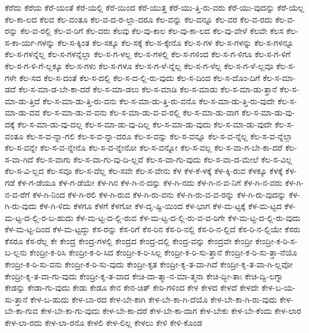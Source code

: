 {ಕೆರೆದು
ಕೆರೆಯ
ಕೆರೆ-ಯಂತೆ
ಕೆರೆ-ಯಲ್ಲಿ
ಕೆರೆ-ಯಿಂದ
ಕೆರೆ-ಯುತ್ತ
ಕೆರೆ-ಯು-ತ್ತಿ-ರು-ವರು
ಕೆರೆ-ಯು-ವುದನ್ನು
ಕೆರೆ-ಯೆಲ್ಲ
ಕೆಲ-ಕಾ-ಲದ
ಕೆಲವ
ಕೆಲ-ವಂತೂ
ಕೆಲ-ವ-ದ-ರ-ಲ್ಲಾ-ದರೂ
ಕೆಲ-ವನ್ನು
ಕೆಲ-ವನ್ನೂ
ಕೆಲ-ವರ
ಕೆಲ-ವ-ರದು
ಕೆಲ-ವ-ರನ್ನು
ಕೆಲ-ವ-ರಲ್ಲಿ
ಕೆಲ-ವ-ರಿಗೆ
ಕೆಲ-ವರು
ಕೆಲವು
ಕೆಲ-ವು-ಕಾಲ
ಕೆಲ-ವು-ಕಾ-ಲದ
ಕೆಲ-ವು-ವೇಳೆ
ಕೆಲವೇ
ಕೆಲಸ
ಕೆಲ-ಸ-ಕಾ-ರ್ಯ-ಗಳನ್ನು
ಕೆಲ-ಸ-ಕ್ಕಿಂತ
ಕೆಲ-ಸಕ್ಕೂ
ಕೆಲ-ಸಕ್ಕೆ
ಕೆಲ-ಸ-ಕ್ಕೇನೊ
ಕೆಲ-ಸ-ಗಳ
ಕೆಲ-ಸ-ಗಳನ್ನು
ಕೆಲ-ಸ-ಗಳನ್ನೂ
ಕೆಲ-ಸ-ಗಳನ್ನೆಲ್ಲ
ಕೆಲ-ಸ-ಗಳನ್ನೆಲ್ಲಾ
ಕೆಲ-ಸ-ಗ-ಳಲ್ಲ
ಕೆಲ-ಸ-ಗಳಲ್ಲಿ
ಕೆಲ-ಸ-ಗಳಿಂದ
ಕೆಲ-ಸ-ಗ-ಳಿಗೂ
ಕೆಲ-ಸ-ಗ-ಳಿಗೆ
ಕೆಲ-ಸ-ಗ-ಳಿ-ಗೆ-ಲ್ಲಕ್ಕೂ
ಕೆಲ-ಸ-ಗಳು
ಕೆಲ-ಸ-ಗಳೂ
ಕೆಲ-ಸ-ಗ-ಳೆ-ನ್ನೆಲ್ಲ
ಕೆಲ-ಸ-ಗ-ಳೆಲ್ಲ
ಕೆಲ-ಸ-ಗ-ಳೆ-ಲ್ಲವೂ
ಕೆಲ-ಸ-ಗಳೇ
ಕೆಲ-ಸದ
ಕೆಲ-ಸ-ದಂತೆ
ಕೆಲ-ಸ-ದಲ್ಲಿ
ಕೆಲ-ಸ-ದ-ಲ್ಲಿ-ರು-ವುದು
ಕೆಲ-ಸ-ದಿಂದ
ಕೆಲ-ಸ-ದೊಂ-ದಿಗೆ
ಕೆಲ-ಸ-ಮಾ-ಡದೆ
ಕೆಲ-ಸ-ಮಾ-ಡ-ಬೇ-ಕಾ-ದರೆ
ಕೆಲ-ಸ-ಮಾ-ಡಲು
ಕೆಲ-ಸ-ಮಾಡಿ
ಕೆಲ-ಸ-ಮಾಡು
ಕೆಲ-ಸ-ಮಾ-ಡು-ತ್ತಾನೆ
ಕೆಲ-ಸ-ಮಾ-ಡು-ತ್ತಿದೆ
ಕೆಲ-ಸ-ಮಾ-ಡು-ತ್ತಿ-ರು-ವನು
ಕೆಲ-ಸ-ಮಾ-ಡು-ತ್ತಿ-ರು-ವನೊ
ಕೆಲ-ಸ-ಮಾ-ಡು-ತ್ತಿ-ರು-ವುದೇ
ಕೆಲ-ಸ-ಮಾ-ಡು-ವವ
ಕೆಲ-ಸ-ಮಾ-ಡು-ವ-ವನು
ಕೆಲ-ಸ-ಮಾ-ಡು-ವ-ವ-ರಲ್ಲಿ
ಕೆಲ-ಸ-ಮಾ-ಡು-ವಾಗ
ಕೆಲ-ಸ-ಮಾ-ಡು-ವು-ದಕ್ಕೆ
ಕೆಲ-ಸ-ಮಾ-ಡು-ವು-ದಲ್ಲ
ಕೆಲ-ಸ-ಮಾ-ಡು-ವು-ದಿಲ್ಲ
ಕೆಲ-ಸ-ಮಾ-ಡು-ವುದು
ಕೆಲ-ಸ-ಮಾ-ಡು-ವುದೇ
ಕೆಲ-ಸ-ವಂತೂ
ಕೆಲ-ಸ-ವ-ನ್ನಾ-ಗಲಿ
ಕೆಲ-ಸ-ವ-ನ್ನಾ-ದರೂ
ಕೆಲ-ಸ-ವನ್ನು
ಕೆಲ-ಸ-ವನ್ನೂ
ಕೆಲ-ಸ-ವ-ನ್ನೆಲ್ಲ
ಕೆಲ-ಸ-ವ-ನ್ನೆಲ್ಲಾ
ಕೆಲ-ಸ-ವನ್ನೇ
ಕೆಲ-ಸ-ವ-ನ್ನೇನೊ
ಕೆಲ-ಸ-ವ-ನ್ನೇನೋ
ಕೆಲ-ಸ-ವನ್ನೋ
ಕೆಲ-ಸ-ವಲ್ಲ
ಕೆಲ-ಸ-ವಾ-ಗ-ಬೇ-ಕಾ-ದರೆ
ಕೆಲ-ಸ-ವಾ-ಗಿದೆ
ಕೆಲ-ಸ-ವಾಗು
ಕೆಲ-ಸ-ವಾ-ಗು-ವು-ದಿ-ಲ್ಲವೆ
ಕೆಲ-ಸ-ವಾ-ಗು-ವುದು
ಕೆಲ-ಸ-ವಾ-ದ-ಮೇಲೆ
ಕೆಲ-ಸ-ವಿಲ್ಲ
ಕೆಲ-ಸ-ವಿ-ಲ್ಲದ
ಕೆಲ-ಸವೂ
ಕೆಲ-ಸ-ವೆಲ್ಲ
ಕೆಲ-ಸವೇ
ಕೆಲ-ಸ-ವೇನು
ಕೆಳ
ಕೆಳ-ಕೆ-ಳಕ್ಕೆ
ಕೆಳ-ಕ್ಕಿ-ರುವ
ಕೆಳಕ್ಕೂ
ಕೆಳಕ್ಕೆ
ಕೆಳ-ಗಡೆ
ಕೆಳ-ಗ-ಡೆಯೂ
ಕೆಳ-ಗ-ಡೆಯೇ
ಕೆಳ-ಗಿನ
ಕೆಳ-ಗಿ-ನ-ದನ್ನು
ಕೆಳ-ಗಿ-ನದು
ಕೆಳ-ಗಿ-ನ-ವ-ನಿಗೆ
ಕೆಳ-ಗಿ-ನ-ವರು
ಕೆಳ-ಗಿ-ನ-ವ-ರೆಗೆ
ಕೆಳ-ಗಿ-ನಿಂದ
ಕೆಳ-ಗಿ-ರಲಿ
ಕೆಳ-ಗಿ-ರುವ
ಕೆಳ-ಗಿ-ರು-ವನು
ಕೆಳ-ಗಿ-ರು-ವ-ವ-ರನ್ನು
ಕೆಳ-ಗಿ-ರು-ವುದನ್ನು
ಕೆಳ-ಗಿ-ರು-ವುದು
ಕೆಳ-ಗಿ-ಳಿದು
ಕೆಳಗೂ
ಕೆಳಗೆ
ಕೆಳಗೋ
ಕೆಳ-ದೃ-ಷ್ಟಿ-ಯಿಂದ
ಕೆಳ-ಭಾಗ
ಕೆಳ-ಮ-ಟ್ಟಕ್ಕೆ
ಕೆಳ-ಮ-ಟ್ಟದ
ಕೆಳ-ಮ-ಟ್ಟ-ದ-ಲ್ಲಿ-ರ-ಬ-ಹುದು
ಕೆಳ-ಮ-ಟ್ಟ-ದ-ಲ್ಲಿ-ರುವ
ಕೆಳ-ಮ-ಟ್ಟ-ದ-ಲ್ಲಿ-ರು-ವ-ವ-ರಿಗೇ
ಕೆಳ-ಮ-ಟ್ಟ-ದ-ಲ್ಲಿ-ರು-ವುದು
ಕೆಳ-ಮ-ಟ್ಟ-ದಿಂದ
ಕೆಳ-ಮ-ಟ್ಟದ್ದು
ಕೆಸ-ರನ್ನು
ಕೆಸ-ರಿಗೆ
ಕೆಸ-ರಿನ
ಕೆಸ-ರಿ-ನಲ್ಲಿ
ಕೆಸ-ರಿ-ನ-ಲ್ಲಿದೆ
ಕೆಸ-ರಿ-ನ-ಲ್ಲಿಯೇ
ಕೆಸರು
ಕೆಸರೂ
ಕೆಸ-ರೆಲ್ಲ
ಕೇ
ಕೇಂದ್ರ
ಕೇಂದ್ರ-ಗಳಲ್ಲಿ
ಕೇಂದ್ರದ
ಕೇಂದ್ರ-ದಲ್ಲಿ
ಕೇಂದ್ರ-ವನ್ನು
ಕೇಂದ್ರವೇ
ಕೇಂದ್ರೀ
ಕೇಂದ್ರೀ-ಕ-ರಿ-ಸ-ಬ-ಲ್ಲನು
ಕೇಂದ್ರೀ-ಕ-ರಿಸಿ
ಕೇಂದ್ರೀ-ಕ-ರಿ-ಸಿದ
ಕೇಂದ್ರೀ-ಕ-ರಿ-ಸಿಲ್ಲ
ಕೇಂದ್ರೀ-ಕ-ರಿ-ಸು-ತ್ತಾನೆ
ಕೇಂದ್ರೀ-ಕ-ರಿ-ಸು-ತ್ತಾ-ನೆಯೊ
ಕೇಂದ್ರೀ-ಕ-ರಿ-ಸು-ವನು
ಕೇಂದ್ರೀ-ಕ-ರಿ-ಸು-ವುದು
ಕೇಂದ್ರೀ-ಕೃತ
ಕೇಂದ್ರೀ-ಕೃ-ತ-ವಾ-ಗಿದೆ
ಕೇಂದ್ರೀ-ಕೃ-ತ-ವಾ-ಗಿ-ಲ್ಲವೋ
ಕೇಂದ್ರೀ-ಕೃ-ತ-ವಾ-ಗು-ವುದು
ಕೇಂದ್ರೀ-ಕೃ-ತ-ವಾದ
ಕೇಚಿ-ದಾ-ತ್ಮಾ-ನ-ಮಾ-ತ್ಮನಾ
ಕೇಚಿ-ದ್ಭೀ-ತಾಃ
ಕೇಚಿ-ದ್ವಿ-ಲಗ್ನಾ
ಕೇಡನ್ನು
ಕೇಡಾ-ಗು-ವುದು
ಕೇಡು
ಕೇಡೂ
ಕೇನ
ಕೇನ-ಚಿತ್
ಕೇರಿ-ಗಳಿಂದ
ಕೇಳ
ಕೇಳದ
ಕೇಳದೆ
ಕೇಳದೇ
ಕೇಳ-ಬ-ಯ-ಸು-ತ್ತಾನೆ
ಕೇಳ-ಬ-ಹುದು
ಕೇಳ-ಬಾ-ರದ
ಕೇಳ-ಬೇ-ಕಾಗಿ
ಕೇಳ-ಬೇ-ಕಾ-ಗಿ-ದೆಯೊ
ಕೇಳ-ಬೇ-ಕಾ-ಗಿ-ರು-ವುದು
ಕೇಳ-ಬೇ-ಕಾ-ಗುವ
ಕೇಳ-ಬೇ-ಕಾ-ಗು-ವುದು
ಕೇಳ-ಬೇ-ಕಾ-ದರೆ
ಕೇಳ-ಬೇ-ಕಾ-ದಾಗ
ಕೇಳ-ಬೇಕು
ಕೇಳ-ಬೇ-ಕೆಂದು
ಕೇಳ-ಲಾರ
ಕೇಳ-ಲಾ-ರದು
ಕೇಳ-ಲಾ-ರನೊ
ಕೇಳಲಿ
ಕೇಳ-ಲಿಲ್ಲ
ಕೇಳಲು
ಕೇಳಿ
ಕೇಳಿ-ಕೊಂಡ
}
